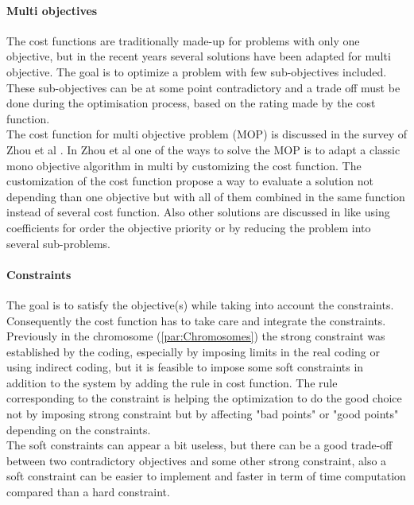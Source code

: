 \paragraph*{Multi objectives}
The cost functions are traditionally made-up for  problems with only one objective, but in the recent years several solutions have been adapted for multi objective. The goal is to optimize a problem with few sub-objectives included. These sub-objectives can be at some point contradictory and a trade off must be done during the optimisation process, based on the rating made by the cost function. \\
 The cost function for multi objective problem (MOP) is discussed in the survey of Zhou et al \cite{75*zhou2011}. In Zhou et al \cite{75*zhou2011} one of the ways to solve the MOP is to adapt a classic mono objective algorithm in multi by customizing the cost function. The customization of the cost function propose a way to evaluate a solution not depending than one objective but with all of them combined in the same function instead of several cost function. 
 Also other solutions are discussed in \cite{75*zhou2011} like using coefficients for order the objective priority or by reducing the problem into several sub-problems. \\ %

\paragraph*{Constraints}
The goal is to satisfy the objective(s) while taking into account the constraints. Consequently the cost function has to take care and integrate the constraints. 
 Previously in the chromosome (\ref{par:Chromosomes}) the strong constraint was established by the coding, especially by imposing limits in the real coding or using indirect coding, but it is feasible to impose some soft constraints in addition to the system by adding the rule in cost function. The rule corresponding to the constraint is helping the optimization to do the good choice not by imposing strong constraint but by affecting "bad points" or "good points" depending on the constraints. \\
 The soft constraints can appear a bit useless, but there can be a good trade-off between two contradictory objectives and some other strong constraint, also a soft constraint can be easier to implement and faster in term of time computation compared than a hard constraint.  

